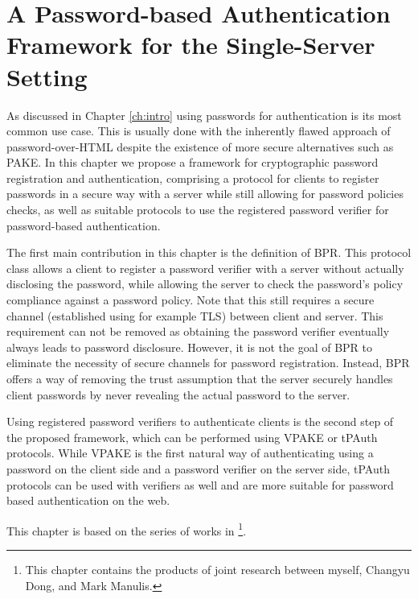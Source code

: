 \chapter[A Password Authentication Framework for the Single-Server Setting]{A Password-based Authentication Framework for the Single-Server Setting} \label{ch:vpake}

As discussed in Chapter \ref{ch:intro} using passwords for authentication is its most common use case. 
This is usually done with the inherently flawed approach of password-over-\ac{HTML} despite the existence of more secure alternatives such as \ac{PAKE}.
In this chapter we propose a framework for cryptographic password registration and authentication, comprising a protocol for clients to register passwords in a secure way with a server while still allowing for password policies checks, as well as suitable protocols to use the registered password verifier for password-based authentication.

The first main contribution in this chapter is the definition of \acl{BPR}.
This protocol class allows a client to register a password verifier with a server without actually disclosing the password, while allowing the server to check the password's policy compliance against a password policy.
Note that this still requires a secure channel (established using for example \ac{TLS}) between client and server.
This requirement can not be removed as obtaining the password verifier eventually always leads to password disclosure.
However, it is not the goal of \ac{BPR} to eliminate the necessity of secure channels for password registration.
Instead, \ac{BPR} offers a way of removing the trust assumption that the server securely handles client passwords by never revealing the actual password to the server.

Using registered password verifiers to authenticate clients is the second step of the proposed framework, which can be performed using \ac{VPAKE} or \ac{tPAuth} protocols.
While \ac{VPAKE} is the first natural way of authenticating using a password on the client side and a password verifier on the server side, \ac{tPAuth} protocols can be used with verifiers as well and are more suitable for password based authentication on the web.
 
\smallskip
\noindent
This chapter is based on the series of works in \cite{KieferM14b,KieferM15a,DongK15a}\footnote{This chapter contains the products of joint research between myself, Changyu Dong, and Mark Manulis.}.
 
